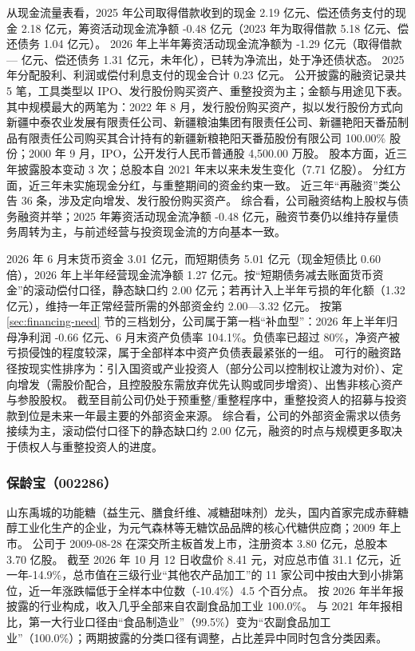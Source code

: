  从现金流量表看，2025 年公司取得借款收到的现金 2.19 亿元、偿还债务支付的现金 2.18 亿元，筹资活动现金流净额 -0.48 亿元（2023 年为取得借款 5.18 亿元、偿还债务 1.04 亿元）。 2026 年上半年筹资活动现金流净额为 -1.29 亿元（取得借款 — 亿元、偿还债务 1.31 亿元，未年化），已转为净流出，处于净还债状态。 2025 年分配股利、利润或偿付利息支付的现金合计 0.23 亿元。 公开披露的融资记录共 5 笔，工具类型以 IPO、发行股份购买资产、重整投资为主；金额与用途见下表。 其中规模最大的两笔为：2022 年 8 月，发行股份购买资产，拟以发行股份方式向新疆中泰农业发展有限责任公司、新疆粮油集团有限责任公司、新疆艳阳天番茄制品有限责任公司购买其合计持有的新疆新粮艳阳天番茄股份有限公司 100.00\% 股份；2000 年 9 月，IPO，公开发行人民币普通股 4,500.00 万股。 股本方面，近三年披露股本变动 3 次；总股本自 2021 年末以来未发生变化（7.71 亿股）。 分红方面，近三年未实施现金分红，与重整期间的资金约束一致。 近三年“再融资”类公告 36 条，涉及定向增发、发行股份购买资产。 综合看，公司融资结构上股权与债务融资并举；2025 年筹资活动现金流净额 -0.48 亿元，融资节奏仍以维持存量债务周转为主，与前述经营与投资现金流的方向基本一致。

 2026 年 6 月末货币资金 3.01 亿元，而短期债务 5.01 亿元（现金短债比 0.60 倍），2026 年上半年经营现金流净额 1.27 亿元。按“短期债务减去账面货币资金”的滚动偿付口径，静态缺口约 2.00 亿元；若再计入上半年亏损的年化额（1.32 亿元），维持一年正常经营所需的外部资金约 2.00---3.32 亿元。 按第 \ref{sec:financing-need} 节的三档划分，公司属于第一档“补血型”：2026 年上半年归母净利润 -0.66 亿元、6 月末资产负债率 104.1\%。负债率已超过 80\%，净资产被亏损侵蚀的程度较深，属于全部样本中资产负债表最紧张的一组。 可行的融资路径按现实性排序为：引入国资或产业投资人（部分公司以控制权让渡为对价）、定向增发（需股价配合，且控股股东需放弃优先认购或同步增资）、出售非核心资产与参股股权。 截至目前公司仍处于预重整/重整程序中，重整投资人的招募与投资款到位是未来一年最主要的外部资金来源。 综合看，公司的外部资金需求以债务接续为主，滚动偿付口径下的静态缺口约 2.00 亿元，融资的时点与规模更多取决于债权人与重整投资人的进度。




\subsubsection{保龄宝（002286）}
\label{co:002286}

 山东禹城的功能糖（益生元、膳食纤维、减糖甜味剂）龙头，国内首家完成赤藓糖醇工业化生产的企业，为元气森林等无糖饮品品牌的核心代糖供应商；2009 年上市。 公司于 2009-08-28 在深交所主板首发上市，注册资本 3.80 亿元，总股本 3.70 亿股。 截至 2026 年 10 月 12 日收盘价 8.41 元，对应总市值 31.1 亿元，近一年-14.9\%，总市值在三级行业“其他农产品加工”的 11 家公司中按由大到小排第位，近一年涨跌幅低于全样本中位数（-10.4\%）4.5 个百分点。 按 2026 年半年报披露的行业构成，收入几乎全部来自农副食品加工业 100.0\%。 与 2021 年年报相比，第一大行业口径由“食品制造业”（99.5\%）变为“农副食品加工业”（100.0\%）；两期披露的分类口径有调整，占比差异中同时包含分类因素。


